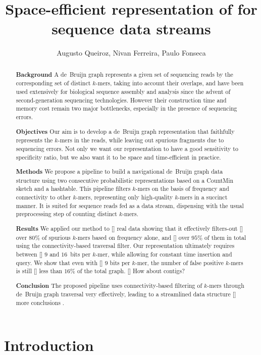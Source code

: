 \documentclass[a4paper,12pt]{article}
\title{Space-efficient representation of \dBG{s} for sequence data streams}
\author{Augusto Queiroz, Nivan Ferreira, Paulo Fonseca}
\newcommand{\dBG}{de~Bruijn graph\xspace}
\newcommand{\cm}{CountMin\xspace}
\newcommand{\kmer}{\mbox{$k$-mer}\xspace}
\newcommand{\kmers}{\mbox{$k$-mers}\xspace}
\newcommand{\todo}[2][]{\color{red} [#1] #2 \color{black}}
\begin{document}
	
\maketitle

\begin{abstract}
\noindent\textbf{Background} A \dBG represents a given set of sequencing reads by the corresponding set of distinct \kmers, taking into account their overlaps, and have been used extensively for biological sequence assembly and analysis since the advent of second-generation sequencing technologies. However their construction time and memory cost remain two major bottlenecks, especially in the presence of sequencing errors.

\noindent\textbf{Objectives} Our aim is to develop a \dBG representation that faithfully represents the \kmers in the reads, while leaving out spurious fragments due to sequencing errors. Not only we want our representation to have a good sensitivity to specificity ratio, but we also want it to be space and time-efficient in practice.

\noindent\textbf{Methods} We propose a pipeline to build a navigational \dBG data structure using two consecutive probabilistic representations based on a \cm sketch and a hashtable. This pipeline filters \kmer{s} on the basis of frequency and connectivity to other \kmer{s}, representing only high-quality \kmer{s} in a succinct manner. It is suited for sequence reads fed as a data stream, dispensing with the usual preprocessing step of counting distinct \kmers. 

\noindent\textbf{Results} We applied our method to \todo{real data} showing that it effectively filters-out \todo{over $80\%$} of spurious \kmer{s} based on frequency alone, and \todo{over $95\%$} of them in total using the connectivity-based traversal filter. Our representation ultimately requires between \todo{$9$ and $16$~bits} per \kmer, while allowing for constant time insertion and query. We show that even with \todo{$9$} bits per \kmer, the number of false positive \kmer{s} is still \todo{less than $16\%$} of the total graph. \todo{How about contigs?}

\noindent\textbf{Conclusion} The proposed pipeline uses connectivity-based filtering of \kmers through \dBG traversal very effectively, leading to a streamlined data structure \todo{more conclusions}.

\end{abstract}

	
\section{Introduction}
\end{document}
